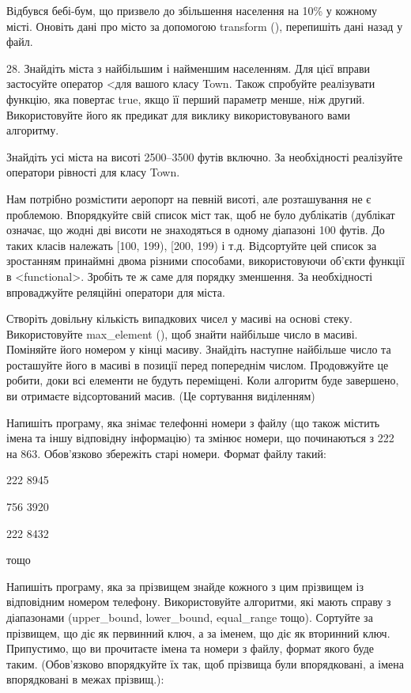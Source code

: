 \documentclass[]{article}
\begin{document}
Відбувся бебі-бум, що призвело до збільшення населення на 10\% у кожному
місті. Оновіть дані про місто за допомогою transform (), перепишіть дані
назад у файл.

28. Знайдіть міста з найбільшим і найменшим населенням. Для цієї вправи
застосуйте оператор \textless{}для вашого класу Town. Також спробуйте
реалізувати функцію, яка повертає true, якщо її перший параметр менше,
ніж другий. Використовуйте його як предикат для виклику
використовуваного вами алгоритму.

Знайдіть усі міста на висоті 2500--3500 футів включно. За необхідності
реалізуйте оператори рівності для класу Town.

Нам потрібно розмістити аеропорт на певній висоті, але розташування не є
проблемою. Впорядкуйте свій список міст так, щоб не було дублікатів
(дублікат означає, що жодні дві висоти не знаходяться в одному діапазоні
100 футів. До таких класів належать {[}100, 199), {[}200, 199) і т.д.
Відсортуйте цей список за зростанням принаймні двома різними способами,
використовуючи об'єкти функції в \textless{}functional\textgreater{}.
Зробіть те ж саме для порядку зменшення. За необхідності впроваджуйте
реляційні оператори для міста.

Створіть довільну кількість випадкових чисел у масиві на основі стеку.
Використовуйте max\_element (), щоб знайти найбільше число в масиві.
Поміняйте його номером у кінці масиву. Знайдіть наступне найбільше число
та росташуйте його в масиві в позиції перед попереднім числом.
Продовжуйте це робити, доки всі елементи не будуть переміщені. Коли
алгоритм буде завершено, ви отримаєте відсортований масив. (Це
сортування виділенням)

Напишіть програму, яка знімає телефонні номери з файлу (що також містить
імена та іншу відповідну інформацію) та змінює номери, що починаються з
222 на 863. Обов'язково збережіть старі номери. Формат файлу такий:

222 8945

756 3920

222 8432

тощо

Напишіть програму, яка за прізвищем знайде кожного з цим прізвищем із
відповідним номером телефону. Використовуйте алгоритми, які мають справу
з діапазонами (upper\_bound, lower\_bound, equal\_range тощо). Сортуйте
за прізвищем, що діє як первинний ключ, а за іменем, що діє як вторинний
ключ. Припустимо, що ви прочитаєте імена та номери з файлу, формат якого
буде таким. (Обов'язково впорядкуйте їх так, щоб прізвища були
впорядковані, а імена впорядковані в межах прізвищ.):
\end{document}
